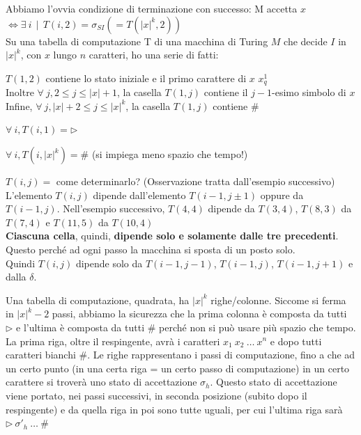 \documentclass[10pt]{book}
\begin{document}
Abbiamo l'ovvia condizione di terminazione con successo: M accetta $x$ $\Leftrightarrow \exists\:i\:\:|\:\:T(i, 2) = \sigma_{SI} (= T(|x|^k, 2))$\\
Su una tabella di computazione T di una macchina di Turing $M$ che decide $I$ in $|x|^k$, con $x$ lungo $n$ caratteri, ho una serie di fatti:
\begin{list}{}{}
	\item $T(1, 2)$ contiene lo stato iniziale e il primo carattere di $x$ $x_q^1$\\
	Inoltre $\forall\:j, 2\leq j \leq |x| + 1$, la casella $T(1, j)$ contiene il $j - 1$-esimo simbolo di $x$\\
	Infine, $\forall\:j, |x| + 2 \leq j \leq |x|^k$, la casella $T(1, j)$ contiene $\#$
	\item $\forall\:i, T(i, 1) = \triangleright$
	\item $\forall\:i, T(i, |x|^k) = \#$ (si impiega meno spazio che tempo!)
	\item $T(i, j) = $ come determinarlo? (Osservazione tratta dall'esempio successivo)\\
	L'elemento $T(i, j)$ dipende dall'elemento $T(i-1, j\pm1)$ oppure da $T(i-1, j)$. Nell'esempio successivo, $T(4, 4)$ dipende da $T(3, 4)$, $T(8, 3)$ da $T(7, 4)$ e $T(11, 5)$ da $T(10, 4)$\\
	\textbf{Ciascuna cella}, quindi, \textbf{dipende solo e solamente dalle tre precedenti}. Questo perché ad ogni passo la macchina si sposta di un posto solo.\\
	Quindi $T(i, j)$ dipende solo da $T(i-1, j-1)$, $T(i-1, j)$, $T(i-1, j+1)$ e dalla $\delta$.
\end{list}
Una tabella di computazione, quadrata, ha $|x|^k$ righe/colonne. Siccome si ferma in $|x|^k - 2$ passi, abbiamo la sicurezza che la prima colonna è composta da tutti $\triangleright$ e l'ultima è composta da tutti $\#$ perché non si può usare più spazio che tempo.\\
La prima riga, oltre il respingente, avrà i caratteri $x_1\:x_2\:\ldots\:x^n$ e dopo tutti caratteri bianchi $\#$. Le righe rappresentano i passi di computazione, fino a che ad un certo punto (in una certa riga = un certo passo di computazione) in un certo carattere si troverà uno stato di accettazione $\sigma_h$. Questo stato di accettazione viene portato, nei passi successivi, in seconda posizione (subito dopo il respingente) e da quella riga in poi sono tutte uguali, per cui l'ultima riga sarà $\triangleright\:\sigma'_h\:\ldots\:\#$
\pagebreak
\end{document}
